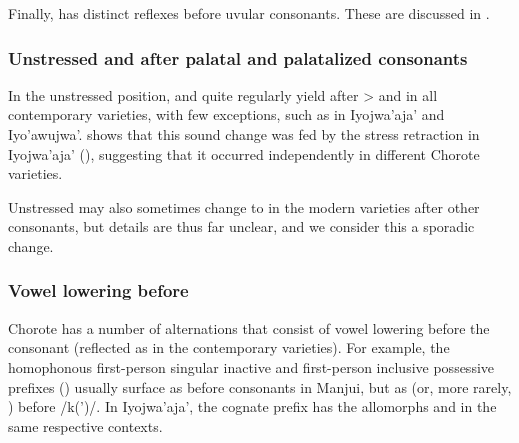 Finally,  has distinct reflexes before uvular consonants. These are discussed in .

\subsubsection{Unstressed  and  after palatal and palatalized consonants} \label{ch-u-i}

In the unstressed position,  and  quite regularly yield  after  >  and  in all contemporary varieties, with few exceptions, such as  in Iyojwa’aja’ and Iyo’awujwa’.  shows that this sound change was fed by the stress retraction in Iyojwa’aja’ (), suggesting that it occurred independently in different Chorote varieties.

\begin{exe}
    \ex {}\label{u-i-yekiun}
    \ex {}\label{u-i-kojaj}
    \ex {}
    \ex {}
    \ex {}
    \ex {}
    \ex {}
\end{exe}

Unstressed  may also sometimes change to  in the modern varieties after other consonants, but details are thus far unclear, and we consider this a sporadic change.

\begin{exe}
    \ex {}
    \ex {}
\end{exe}

\subsubsection{Vowel lowering before }\label{ch-lowering}

Chorote has a number of alternations that consist of vowel lowering before the consonant  (reflected as  in the contemporary varieties). For example, the homophonous first-person singular inactive and first-person inclusive possessive prefixes () usually surface as  before consonants in Manjui, but as  (or, more rarely, ) before /k(’)/. In Iyojwa’aja’, the cognate prefix has the allomorphs  and  in the same respective contexts.

